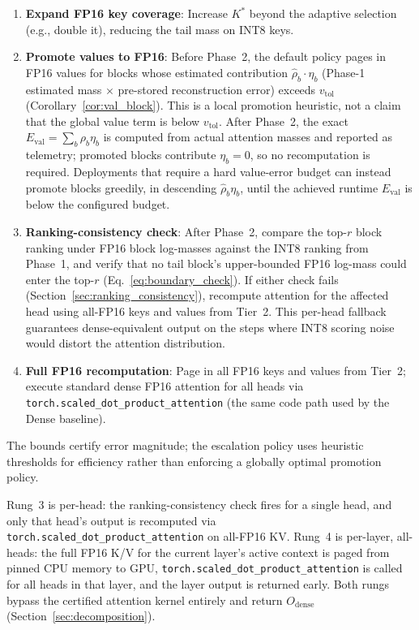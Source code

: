 \documentclass[10pt,twocolumn,a4paper]{article}
\theoremstyle{definition}
\theoremstyle{remark}
\newcommand{\torchsdpa}{\texttt{torch.scaled\_\hspace{0pt}dot\_\hspace{0pt}product\_\hspace{0pt}attention}}
\begin{document}
\begin{enumerate}[leftmargin=2em,itemsep=2pt]
  \item \textbf{Expand FP16 key coverage}: Increase $K^*$ beyond the adaptive selection (e.g., double it), reducing the tail mass on INT8 keys.
  \item \textbf{Promote values to FP16}: Before Phase~2, the default policy pages in FP16 values for blocks whose estimated contribution $\hat{\rho}_b \cdot \eta_b$ (Phase-1 estimated mass $\times$ pre-stored reconstruction error) exceeds $v_{\mathrm{tol}}$ (Corollary~\ref{cor:val_block}).  This is a local promotion heuristic, not a claim that the global value term is below $v_{\mathrm{tol}}$.  After Phase~2, the exact $E_{\mathrm{val}} = \sum_b \rho_b \eta_b$ is computed from actual attention masses and reported as telemetry; promoted blocks contribute $\eta_b{=}0$, so no recomputation is required.  Deployments that require a hard value-error budget can instead promote blocks greedily, in descending $\hat{\rho}_b\eta_b$, until the achieved runtime $E_{\mathrm{val}}$ is below the configured budget.
  \item \textbf{Ranking-consistency check}: After Phase~2, compare the top-$r$ block ranking under FP16 block log-masses against the INT8 ranking from Phase~1, and verify that no tail block's upper-bounded FP16 log-mass could enter the top-$r$ (Eq.~\ref{eq:boundary_check}).  If either check fails (Section~\ref{sec:ranking_consistency}), recompute attention for the affected head using all-FP16 keys and values from Tier~2.  This per-head fallback guarantees dense-equivalent output on the steps where INT8 scoring noise would distort the attention distribution.
  \item \textbf{Full FP16 recomputation}: Page in all FP16 keys and values from Tier~2; execute standard dense FP16 attention for all heads via \torchsdpa{} (the same code path used by the Dense baseline).
\end{enumerate}

The bounds certify error magnitude; the escalation policy uses heuristic thresholds for efficiency rather than enforcing a globally optimal promotion policy.

Rung~3 is per-head: the ranking-consistency check fires for a single head, and only that head's output is recomputed via \torchsdpa{} on all-FP16 KV\@.  Rung~4 is per-layer, all-heads: the full FP16 K/V for the current layer's active context is paged from pinned CPU memory to GPU, \torchsdpa{} is called for all heads in that layer, and the layer output is returned early.  Both rungs bypass the certified attention kernel entirely and return $O_{\mathrm{dense}}$ (Section~\ref{sec:decomposition}).
\end{document}

